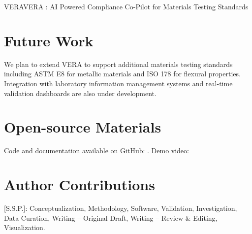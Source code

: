\begin{teamsubmission}{VERA}{VERA : AI Powered Compliance Co-Pilot for Materials Testing Standards}
\section*{Future Work}
We plan to extend VERA to support additional materials testing standards including ASTM E8 for metallic materials and ISO 178 for flexural properties. Integration with laboratory information management systems and real-time validation dashboards are also under development.

\section*{Open-source Materials}
Code and documentation available on GitHub: . Demo video: 

\section*{Author Contributions}
[S.S.P.]: Conceptualization, Methodology, Software, Validation, Investigation, Data Curation, Writing – Original Draft, Writing – Review \& Editing, Visualization.
\end{teamsubmission}



